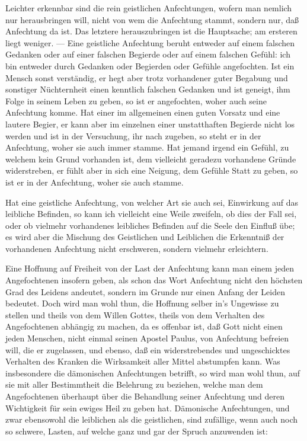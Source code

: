 Leichter erkennbar sind die rein geistlichen Anfechtungen, wofern man nemlich nur herausbringen will, nicht von wem die Anfechtung stammt, sondern nur, daß Anfechtung da ist. Das letztere herauszubringen ist die Hauptsache; am ersteren liegt weniger. — Eine geistliche Anfechtung beruht entweder auf einem falschen Gedanken oder auf einer falschen Begierde oder auf einem falschen Gefühl: ich bin entweder durch Gedanken oder Begierden oder Gefühle angefochten. Ist ein Mensch sonst verständig, er hegt aber trotz vorhandener guter Begabung und sonstiger Nüchternheit einen kenntlich falschen Gedanken und ist geneigt, ihm Folge in seinem Leben zu geben, so ist er angefochten, woher auch seine Anfechtung komme. Hat einer im allgemeinen einen guten Vorsatz und eine lautere Begier, er kann aber im einzelnen einer unstatthaften Begierde nicht los werden und ist in der Versuchung, ihr nach%
zugeben, so steht er in der Anfechtung, woher sie auch immer stamme. Hat jemand irgend ein Gefühl, zu welchem kein Grund vorhanden ist, dem vielleicht geradezu vorhandene Gründe widerstreben, er fühlt aber in sich eine Neigung, dem Gefühle Statt zu geben, so ist er in der Anfechtung, woher sie auch stamme.

Hat eine geistliche Anfechtung, von welcher Art sie auch sei, Einwirkung auf das leibliche Befinden, so kann ich vielleicht eine Weile zweifeln, ob dies der Fall sei, oder ob vielmehr vorhandenes leibliches Befinden auf die Seele den Einfluß übe; es wird aber die Mischung des Geistlichen und Leiblichen die Erkenntniß der vorhandenen Anfechtung nicht erschweren, sondern vielmehr erleichtern.

Eine Hoffnung auf Freiheit von der Last der Anfechtung kann man einem jeden Angefochtenen insofern geben, als schon das Wort Anfechtung nicht den höchsten Grad des Leidens andeutet, sondern im Grunde nur einen Anfang der Leiden bedeutet. Doch wird man wohl thun, die Hoffnung selber in’s Ungewisse zu stellen und theils von dem Willen Gottes, theils von dem Verhalten des Angefochtenen abhängig zu machen, da es offenbar ist, daß Gott nicht einen jeden Menschen, nicht einmal seinen Apostel Paulus, von Anfechtung befreien will, die er zugelassen, und ebenso, daß ein widerstrebendes und ungeschicktes Verhalten des Kranken die Wirksamkeit aller Mittel abstumpfen kann. Was insbesondere die dämonischen Anfechtungen betrifft, so wird man wohl thun, auf sie mit aller Bestimmtheit die Belehrung zu beziehen, welche man dem Angefochtenen überhaupt über die Behandlung seiner Anfechtung
und deren Wichtigkeit für sein ewiges Heil zu geben hat. Dämonische Anfechtungen, und zwar ebensowohl die leiblichen als die geistlichen, sind zufällige, wenn auch noch so schwere, Lasten, auf welche ganz und gar der Spruch anzuwenden ist:

